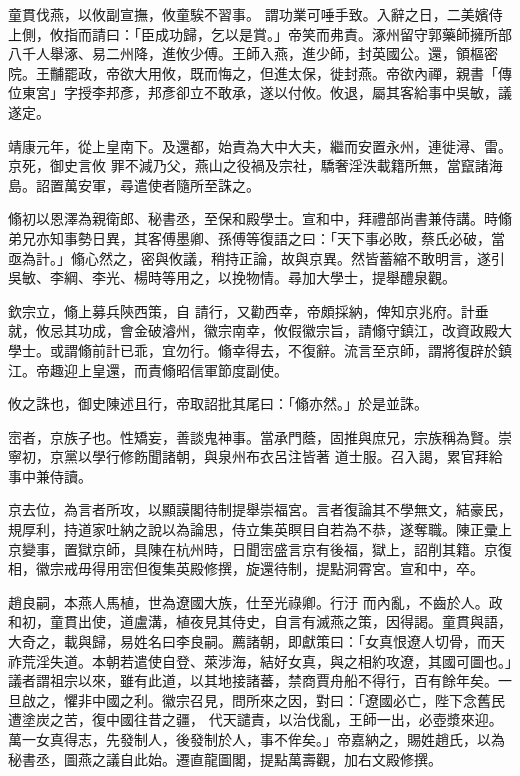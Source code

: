 \begin{pinyinscope}
 童貫伐燕，以攸副宣撫，攸童騃不習事。
 謂功業可唾手致。入辭之日，二美嬪侍上側，攸指而請曰：「臣成功歸，乞以是賞。」帝笑而弗責。涿州留守郭藥師擁所部八千人舉涿、易二州降，進攸少傅。王師入燕，進少師，封英國公。還，領樞密院。王黼罷政，帝欲大用攸，既而悔之，但進太保，徙封燕。帝欲內禪，親書「傳位東宮」字授李邦彥，邦彥卻立不敢承，遂以付攸。攸退，屬其客給事中吳敏，議遂定。



 靖康元年，從上皇南下。及還都，始責為大中大夫，繼而安置永州，連徙潯、雷。京死，御史言攸
 罪不減乃父，燕山之役禍及宗社，驕奢淫泆載籍所無，當竄諸海島。詔置萬安軍，尋遣使者隨所至誅之。



 翛初以恩澤為親衛郎、秘書丞，至保和殿學士。宣和中，拜禮部尚書兼侍講。時翛弟兄亦知事勢日異，其客傅墨卿、孫傅等復語之曰：「天下事必敗，蔡氏必破，當亟為計。」翛心然之，密與攸議，稍持正論，故與京異。然皆蓄縮不敢明言，遂引吳敏、李綱、李光、楊時等用之，以挽物情。尋加大學士，提舉醴泉觀。



 欽宗立，翛上募兵陝西策，自
 請行，又勸西幸，帝頗採納，俾知京兆府。計垂就，攸忌其功成，會金破濬州，徽宗南幸，攸假徽宗旨，請翛守鎮江，改資政殿大學士。或謂翛前計已乖，宜勿行。翛幸得去，不復辭。流言至京師，謂將復辟於鎮江。帝趣迎上皇還，而責翛昭信軍節度副使。



 攸之誅也，御史陳述且行，帝取詔批其尾曰：「翛亦然。」於是並誅。



 崈者，京族子也。性矯妄，善談鬼神事。當承門蔭，固推與庶兄，宗族稱為賢。崇寧初，京黨以學行修飭聞諸朝，與泉州布衣呂注皆著
 道士服。召入謁，累官拜給事中兼侍讀。



 京去位，為言者所攻，以顯謨閣待制提舉崇福宮。言者復論其不學無文，結豪民，規厚利，持道家吐納之說以為論思，侍立集英瞑目自若為不恭，遂奪職。陳正彚上京變事，置獄京師，具陳在杭州時，日聞崈盛言京有後福，獄上，詔削其籍。京復相，徽宗戒毋得用崈但復集英殿修撰，旋還待制，提點洞霄宮。宣和中，卒。



 趙良嗣，本燕人馬植，世為遼國大族，仕至光祿卿。行汙
 而內亂，不齒於人。政和初，童貫出使，道盧溝，植夜見其侍史，自言有滅燕之策，因得謁。童貫與語，大奇之，載與歸，易姓名曰李良嗣。薦諸朝，即獻策曰：「女真恨遼人切骨，而天祚荒淫失道。本朝若遣使自登、萊涉海，結好女真，與之相約攻遼，其國可圖也。」議者謂祖宗以來，雖有此道，以其地接諸蕃，禁商賈舟船不得行，百有餘年矣。一旦啟之，懼非中國之利。徽宗召見，問所來之因，對曰：「遼國必亡，陛下念舊民遭塗炭之苦，復中國往昔之疆，
 代天譴責，以治伐亂，王師一出，必壺漿來迎。萬一女真得志，先發制人，後發制於人，事不侔矣。」帝嘉納之，賜姓趙氏，以為秘書丞，圖燕之議自此始。遷直龍圖閣，提點萬壽觀，加右文殿修撰。




\end{pinyinscope}

